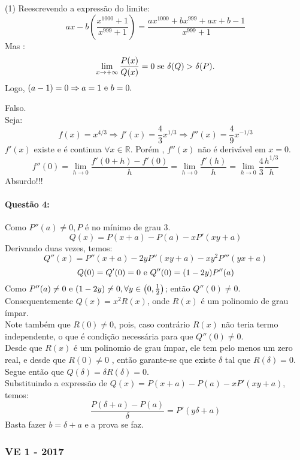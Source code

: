 \documentclass[12pt,a4paper]{article}
\begin{document}
\begin{tasks}(1)
\task Reescrevendo a expressão do limite: $$ax - b \left( \dfrac{x^{1000} + 1}{x^{999} + 1} \right) = \dfrac{ax^{1000} + bx^{999} + ax + b - 1}{x^{999} + 1} $$
Mas : $$\lim\limits_{x \to +\infty } \dfrac{P(x)}{Q(x)} = 0 \textnormal{   se   } \delta(Q) > \delta(P). $$
Logo, $(a - 1) = 0 \Rightarrow a = 1 \textnormal{ e } b = 0.$

\task Falso. \\
Seja: $$f(x) = x^{4/3} \Rightarrow f'(x) = \dfrac{4}{3} x^{1/3} \Rightarrow f''(x) = \dfrac{4}{9} x^{-1/3}$$
$f'(x)$ existe e é continua $\forall x \in \mathbb{R}$. 
Porém , $f''(x)$ não é derivável em $x = 0$.
$$f''(0) = \lim\limits_{h \to 0} \dfrac{f'(0 + h) - f'(0)}{h} = \lim\limits_{h \to 0} \dfrac{f'(h)}{h} = \lim\limits_{h \to 0} \dfrac{4}{3}\dfrac{h^{1/3}}{h}$$ Absurdo!!!
    
\end{tasks}

\paragraph{Questão 4:}
Como $P''(a) \neq 0, P$ é no mínimo de grau 3.
$$Q(x) = P(x+a) - P(a) - xP'(xy + a)$$ Derivando duas vezes, temos:
$$Q''(x) = P''(x+a) - 2yP''(xy + a) - xy^2 P'''(yx + a)$$
$$Q(0) = Q'(0) = 0 \textnormal{ e } Q''(0) = (1 - 2y) P''(a)$$
Como $P''(a) \neq 0 \textnormal{  e  } (1 -2y) \neq 0, \forall y \in \left( 0, \frac{1}{2}\right)$; então $Q''(0) \neq 0$.\\
Consequentemente $Q(x) = x^2 R(x)$, onde $R(x)$ é um polinomio de grau ímpar.\\ 
Note também que $R(0) \neq 0$, pois, caso contrário $R(x)$ não teria termo independente, o que é condição necessária para que $Q''(0) \neq 0$. \\
Desde que $R(x)$ é um polinomio de grau ímpar, ele tem pelo menos um zero real,  e desde que $R(0) \neq 0$ , então garante-se que existe $\delta$ tal que $R(\delta) = 0$.\\
Segue então que $Q(\delta) = \delta R(\delta) = 0.$ \\
Substituindo a expressão de $Q(x) = P(x+a) - P(a) -xP'(xy +a) $, temos: $$\dfrac{P(\delta + a) - P(a)}{\delta} = P'(y \delta + a)$$
Basta fazer $b = \delta + a $ e a prova se faz.

\newpage



\subsubsection{VE 1 - 2017}
\end{document}
